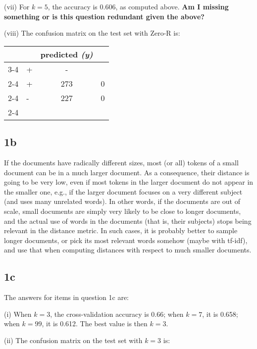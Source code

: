 \documentclass[leqno]{article}
\begin{document}
\hfill

\noindent (vii) For $k = 5$, the accuracy is 0.606, as computed above. \textbf{Am I missing something or is this question redundant given the above?}

\hfill

\noindent (viii) The confusion matrix on the test set with Zero-R is:

\begin{tabular}{l|l|c|c|}
\multicolumn{2}{c}{}&\multicolumn{1}{c}{predicted \textit{(y)}}\\
\cline{3-4}
\multicolumn{2}{c|}{}&+&-\\
\cline{2-4}
\multirow{correct \textit{(r)}}& + & 273 & 0\\
\cline{2-4}
& - & 227 & 0 \\
\cline{2-4}
\end{tabular} 

\subsection*{1b} If the documents have radically different sizes, most (or all) tokens of a small document can be in a much larger document. As a consequence, their distance is 
going to be very low, even if most tokens in the larger document do not appear in the smaller one, e.g., if the larger document focuses on a very different subject (and 
uses many  unrelated words). In other words, if the documents are out of scale, small documents are simply very likely to be close to longer documents, and the actual 
use of words in the documents (that is, their subjects) stops being relevant in the distance metric. In such cases, it is probably better to sample longer documents, or pick 
its most relevant words somehow (maybe with tf-idf), and use that when computing distances with respect to much smaller documents.



\subsection*{1c} The answers for items in question 1c are:

\noindent (i) When $k = 3$, the cross-validation accuracy is 0.66; when $k = 7$, it is 0.658; when $k = 99$, it is 0.612. The best value is then $k = 3$.

\hfill

\noindent (ii) The confusion matrix on the test set with $k = 3$ is:
\end{document}
